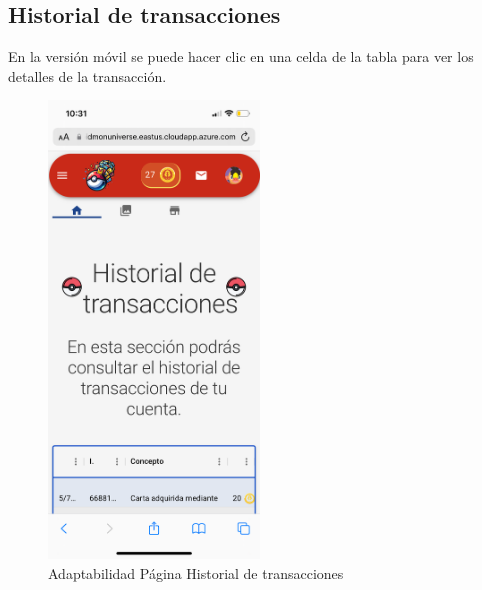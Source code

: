 \subsection*{Historial de transacciones}
En la versión móvil se puede hacer clic en una celda de la tabla para ver los detalles de la transacción.
\begin{figure}[H]
    \centering
    \includegraphics[width=0.5\textwidth]{figures/adaptabilidad/transacciones_1.png}
    \caption{Adaptabilidad Página Historial de transacciones}
    \label{fig:Adap-Historial}
\end{figure}

